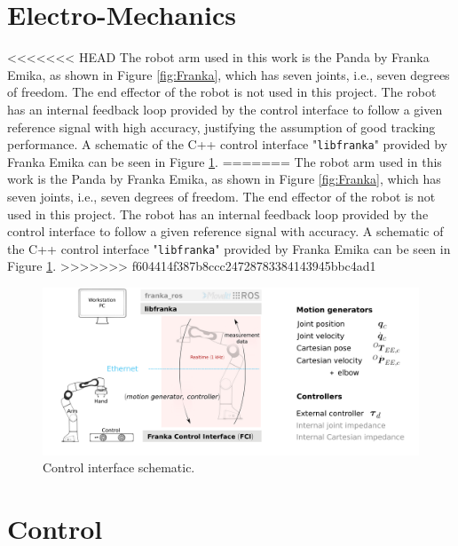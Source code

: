 \documentclass[final]{LTHtwocol} %
\begin{document}
\section{Electro-Mechanics} \label{sec:framework}
<<<<<<< HEAD
The robot arm used in this work is the Panda by Franka Emika, as shown in Figure \ref{fig:Franka}, which has seven joints, i.e., seven degrees of freedom. The end effector of the robot is not used in this project. The robot has an internal feedback loop provided by the control interface to follow a given reference signal with high accuracy, justifying the assumption of good tracking performance. A schematic of the C++ control interface "\texttt{libfranka}" provided by Franka Emika can be seen in Figure \ref{fig:interface}.
=======
The robot arm used in this work is the Panda by Franka Emika, as shown in Figure \ref{fig:Franka}, which has seven joints, i.e., seven degrees of freedom. The end effector of the robot is not used in this project. The robot has an internal feedback loop provided by the control interface to follow a given reference signal with accuracy. A schematic of the C++ control interface "\texttt{libfranka}" provided by Franka Emika can be seen in Figure \ref{fig:interface}.
>>>>>>> f604414f387b8ccc24728783384143945bbc4ad1

\begin{figure}[t]
	\centering
	\includegraphics[width=\linewidth]{rt-interfaces.png}
	\caption{Control interface schematic.}
	\label{fig:interface} 
\end{figure}

\section{Control} \label{sec:control}
\end{document}

